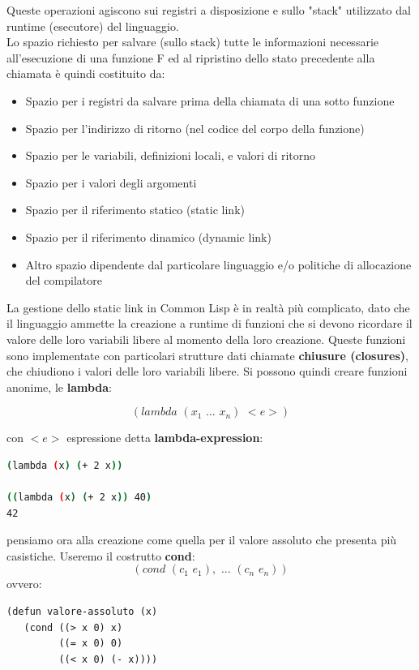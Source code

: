 \documentclass[a4paper,12pt, oneside]{book}
\begin{document}
Queste operazioni agiscono sui registri a disposizione e sullo "stack" utilizzato dal runtime (esecutore) del linguaggio.\\Lo spazio richiesto per salvare (sullo stack) tutte le informazioni necessarie all'esecuzione di
una funzione F ed al ripristino dello stato precedente alla chiamata è quindi costituito da:
\begin{itemize}
\item Spazio per i registri da salvare prima della chiamata di una sotto funzione
\item Spazio per l'indirizzo di ritorno (nel codice del corpo della funzione)
\item Spazio per le variabili, definizioni locali, e valori di ritorno
\item Spazio per i valori degli argomenti
\item Spazio per il riferimento statico (static link)
\item Spazio per il riferimento dinamico (dynamic link)
\item Altro spazio dipendente dal particolare linguaggio e/o politiche di allocazione del compilatore
\end{itemize}
La gestione dello static link in Common Lisp è in realtà più complicato,
dato che il linguaggio ammette la creazione a runtime di funzioni che si
devono ricordare il valore delle loro variabili libere al momento della
loro creazione. Queste funzioni sono implementate con particolari strutture dati chiamate \textbf{chiusure (closures)}, che chiudiono i valori delle loro variabili libere. Si possono quindi creare funzioni anonime, le \textbf{lambda}:
\begin{center}
$$(lambda\,\,(x_1\,\,...\,\,x_n)\,\,<e>)$$
\end{center}
con $<e>$ espressione detta \textbf{lambda-expression}:
\begin{shaded}
\begin{lstlisting}[language=bash]
(lambda (x) (+ 2 x))

((lambda (x) (+ 2 x)) 40)
42
\end{lstlisting}
\end{shaded}
pensiamo ora alla creazione come quella per il valore assoluto che presenta più casistiche. Useremo il costrutto \textbf{cond}:
$$(cond\,\,(c_1\,\,e_1),\,\,...\,\,(c_n\,\,e_n))$$
ovvero:
\begin{verbatim}
(defun valore-assoluto (x)
   (cond ((> x 0) x)
         ((= x 0) 0)
         ((< x 0) (- x))))
\end{verbatim}
\end{document}
